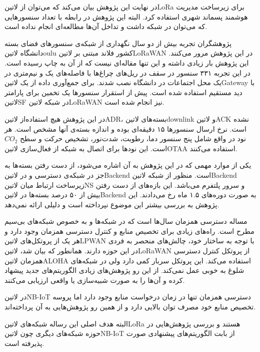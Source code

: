 در نهایت این پژوهش بیان می‌کند که می‌توان از ‌لاتین{LoRa} برای زیرساخت مدیریت هوشمند پسماند شهری استفاده کرد.
البته این پژوهش در رابطه با تعداد سنسورهایی که می‌توان در شبکه داشت و تداخل آن‌ها مطالعه‌ای انجام نداده است.


پژوهشگران  تجربه بیش از دو سال نگهداری از شبکه‌ی سنسورهای فضای بسته دانشگاه ‌لاتین{oulu} کشور فلاند مبتنی بر ‌لاتین{LoRaWAN} در این پژوهش مرور می‌کنند.
این پژوهش بار زیادی داشته و این تنها مقاله‌ای نیست که از آن به چاپ رسیده است. در این تجربه ۳۳۱ سنسور در سقف در ریل‌های چراغ‌ها با فاصله‌های یک و نیم‌متری در یک محل اجتماعات در دانشگاه نصب شدند.
برای جمع‌آوری داده از یک ‌لاتین{Gateway} با دید مستقیم استفاده شده است. پیش از استقرار سنسورها یک تخمین برای پارامتر ‌لاتین{SF} در شبکه ‌لاتین{LoRaWAN} نیز انجام شده است.

در این پژوهش هیچ استفاده‌از ‌لاتین{ADR}، بسته‌های ‌لاتین{downlink} و ‌لاتین{ACK} نشده است. نرخ ارسال سنسورها ۱۵ دقیقه‌ای بوده و اندازه بسته‌ی آنها مشخص است.
هر نود در واقع شامل پنج سنسور دما، رطوبت، شدت‌نور، تشخیص حرکت و سطح $CO_{2}$ است. این نودها برای اتصال به شبکه از فعال‌سازی ‌لاتین{OTAA} استفاده می‌کنند.

یکی از موارد مهمی که در این پژوهش به آن اشاره می‌شود، از دست رفتن بسته‌ها به جز در شبکه‌ی دسترسی و در ‌لاتین{Backend} است.
منظور از شبکه ‌لاتین{Backend} زیرساخت ارتباط میان ‌لاتین{NS} و سرور پلتفرم می‌باشد.
این بازه‌های از دست رفتن بیش از ۵۰ درصد بسته‌ها در ‌لاتین{Backend} به صورت دوره‌های ۱.۵ ماه رخ می‌دادند. این پژوهش به بررسی بیشتر این موضوع نپرداخته است و دلیلی ارائه نمی‌دهد.


مساله دسترسی همزمان سال‌ها است که در شبکه‌ها و به خصوص شبکه‌های بی‌سیم مطرح است. راه‌های زیادی برای تخصیص منابع و کنترل دسترسی همزمان وجود دارد
و هر یک از پروتکل‌های ‌لاتین{LPWAN} با توجه به ساختار خود، چالش‌های منحصر به فردی در این حوزه دارند.
همانطور که بیان شد، ‌لاتین{LoRaWAN} از پروتکل کنترل دسترسی همزمان ‌لاتین{ALOHA} استفاده می‌کند. این پروتکل سربار کمی دارد ولی در شبکه‌های شلوغ به خوبی عمل نمی‌کند.
از این رو پژوهش‌های زیادی الگوریتم‌های جدید پیشهاد کرده و آن‌ها را به صورت شبیه‌سازی یا واقعی ارزیابی می‌کنند.

در ‌لاتین{NB-IoT} دسترسی همزمان تنها در زمان درخواست منابع وجود دارد
اما پروسه تخصیص منابع خود مصرف توان بالایی دارد و از همین رو پژوهش‌هایی به آن پرداخته‌اند.

البته هدف اصلی این رساله شبکه‌های ‌لاتین{LoRa} هستند و بررسی پژوهش‌هایی در حوزه شبکه‌های دیگری چون ‌لاتین{NB-IoT} از بابت الگوریتم‌های پیشنهادی صورت پذیرفته است.

